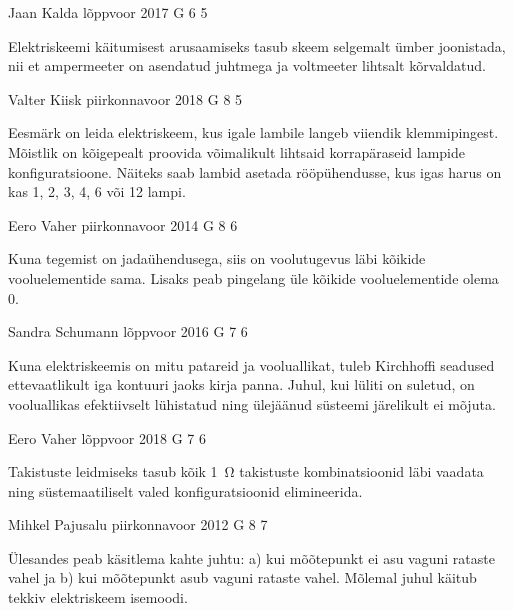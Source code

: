\documentclass[11pt]{article}
\begin{document}
{%
{Jaan Kalda} %
{lõppvoor} %
{2017} %
{G 6} %
{5} %
{

\ifHint
Elektriskeemi käitumisest arusaamiseks tasub skeem selgemalt ümber joonistada, nii et ampermeeter on asendatud juhtmega ja voltmeeter lihtsalt kõrvaldatud.
\fi
}

{Valter Kiisk} %
{piirkonnavoor} %
{2018} %
{G 8} %
{5} %
{

\ifHint
Eesmärk on leida elektriskeem, kus igale lambile langeb viiendik klemmipingest. Mõistlik on kõigepealt proovida võimalikult lihtsaid korrapäraseid lampide konfiguratsioone. Näiteks saab lambid asetada rööpühendusse, kus igas harus on kas 1, 2, 3, 4, 6 või 12 lampi.
\fi
}

{Eero Vaher} %
{piirkonnavoor} %
{2014} %
{G 8} %
{6} %
{

\ifHint
Kuna tegemist on jadaühendusega, siis on voolutugevus läbi kõikide vooluelementide sama. Lisaks peab pingelang üle kõikide vooluelementide olema \num{0}.
\fi
}

{Sandra Schumann} %
{lõppvoor} %
{2016} %
{G 7} %
{6} %
{

\ifHint
Kuna elektriskeemis on mitu patareid ja vooluallikat, tuleb Kirchhoffi seadused ettevaatlikult iga kontuuri jaoks kirja panna. Juhul, kui lüliti on suletud, on vooluallikas efektiivselt lühistatud ning ülejäänud süsteemi järelikult ei mõjuta.
\fi
}

{Eero Vaher} %
{lõppvoor} %
{2018} %
{G 7} %
{6} %
{

\ifHint
Takistuste leidmiseks tasub kõik \SI{1}{\ohm} takistuste kombinatsioonid läbi vaadata ning süstemaatiliselt valed konfiguratsioonid elimineerida.
\fi
}

{Mihkel Pajusalu} %
{piirkonnavoor} %
{2012} %
{G 8} %
{7} %
{

\ifHint
Ülesandes peab käsitlema kahte juhtu: a) kui mõõtepunkt ei asu vaguni rataste vahel ja b) kui mõõtepunkt asub vaguni rataste vahel. Mõlemal juhul käitub tekkiv elektriskeem isemoodi.
\fi
}

}
\end{document}
